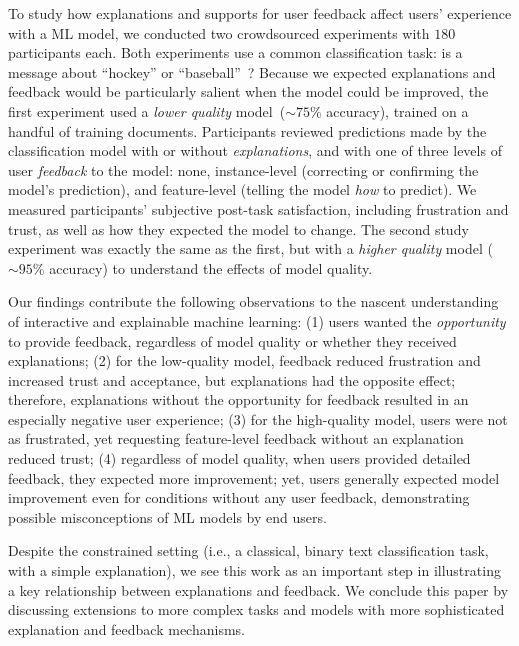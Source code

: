 To study how explanations and supports for user feedback affect users' 
experience with a ML model, we conducted two crowdsourced experiments
with $180$ participants each.
%
Both experiments use a common classification task: is a message about
``hockey'' or ``baseball''~\cite{Settles2011ClosingInstances, Kulesza2015PrinciplesLearning}?
%
Because we expected explanations and feedback would be particularly salient when the model could be improved, the first experiment used a \textit{lower quality} model~($\sim 75\%$ accuracy), trained on a handful of
training documents.
%
Participants reviewed
predictions made by the classification model with or
without \textit{explanations},
and with one of three levels of user \textit{feedback} to the
model: none, instance-level (correcting or confirming the model's prediction), and feature-level (telling the model \textit{how} to predict). 
%
We measured participants' subjective post-task satisfaction, including frustration and trust, as well as
how they expected the model to change. 
%
The second study experiment was exactly the same as the first, but with a \textit{higher quality} model ($\sim 95\%$ accuracy) to understand the effects of model quality.

Our findings contribute the following observations to the nascent
understanding of interactive and explainable machine learning:
%
(1) users wanted the \textit{opportunity} to provide feedback, regardless of model quality or whether they received explanations; 
%
(2) for the low-quality model, feedback reduced frustration and increased trust and acceptance, but explanations had the opposite effect; therefore, explanations without the opportunity for feedback resulted in an especially negative user experience;
%
(3) for the high-quality model, users were not as frustrated, yet requesting feature-level feedback without an explanation reduced trust; %
%
(4) regardless of model quality, when users  %
provided detailed feedback, they expected more improvement; yet, users generally expected model improvement even for conditions without any user feedback, demonstrating possible misconceptions of ML models by end users.
%

Despite the constrained setting (i.e., a classical, binary text classification task, with a simple explanation), we see this work as an important step in illustrating a key relationship between explanations and feedback. We conclude this paper by discussing extensions to more complex tasks and models with more sophisticated explanation and feedback mechanisms.